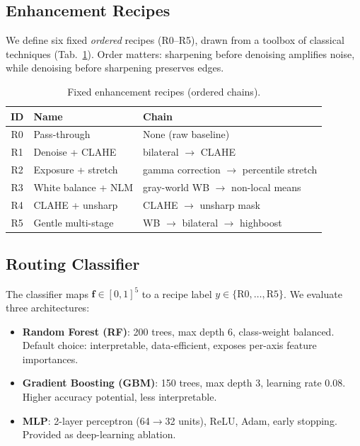 \documentclass[conference]{IEEEtran}
\begin{document}
\subsection{Enhancement Recipes}
\label{subsec:recipes}

We define six fixed \emph{ordered} recipes (R0--R5), drawn from a toolbox of classical techniques (Tab.~\ref{tab:recipes}). Order matters: sharpening before denoising amplifies noise, while denoising before sharpening preserves edges.

\begin{table}[t]
\centering
\caption{Fixed enhancement recipes (ordered chains).}
\label{tab:recipes}
\begin{tabular}{@{}cll@{}}
\toprule
ID & Name & Chain \\
\midrule
R0 & Pass-through & None (raw baseline) \\
R1 & Denoise + CLAHE & bilateral $\rightarrow$ CLAHE \\
R2 & Exposure + stretch & gamma correction $\rightarrow$ percentile stretch \\
R3 & White balance + NLM & gray-world WB $\rightarrow$ non-local means \\
R4 & CLAHE + unsharp & CLAHE $\rightarrow$ unsharp mask \\
R5 & Gentle multi-stage & WB $\rightarrow$ bilateral $\rightarrow$ highboost \\
\bottomrule
\end{tabular}
\end{table}

\subsection{Routing Classifier}
\label{subsec:router}

The classifier maps $\mathbf{f} \in [0,1]^5$ to a recipe label $y \in \{\text{R0},\ldots,\text{R5}\}$. We evaluate three architectures:

\begin{itemize}
    \item \textbf{Random Forest (RF)}: 200 trees, max depth 6, class-weight balanced. Default choice: interpretable, data-efficient, exposes per-axis feature importances.
    \item \textbf{Gradient Boosting (GBM)}: 150 trees, max depth 3, learning rate 0.08. Higher accuracy potential, less interpretable.
    \item \textbf{MLP}: 2-layer perceptron (64$\rightarrow$32 units), ReLU, Adam, early stopping. Provided as deep-learning ablation.
\end{itemize}
\end{document}
